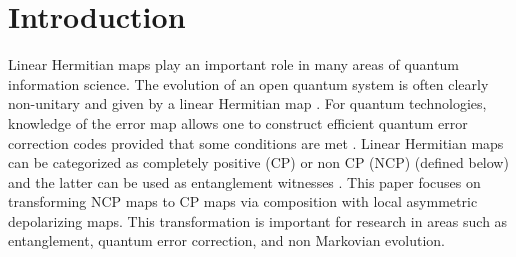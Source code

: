 \documentclass[12pt]{iopart}
\begin{document}
%
%
%
% 
%

\section{Introduction}


Linear Hermitian maps play an important role in many areas of quantum information science. The evolution of an open quantum system is often clearly non-unitary and given by a linear Hermitian map \cite{sudarshan_1961}. For quantum technologies, knowledge of the error map allows one to construct efficient quantum error correction codes provided that some conditions are met \cite{Nielsen_Chuang_Textbook_2011}. Linear Hermitian maps can be categorized as completely positive (CP) or non CP (NCP) (defined below) and the latter can be used as entanglement witnesses \cite{horodcecki1996SepOfMixedStsNecAndSuffCond,Terhal:00}. This paper focuses on transforming NCP maps to CP maps via composition with local asymmetric depolarizing maps. This transformation is important for research in areas such as entanglement, quantum error correction, and non Markovian evolution.
\end{document}
